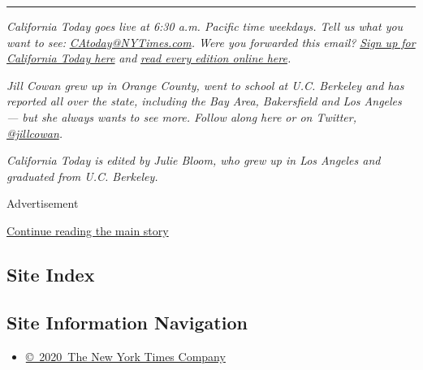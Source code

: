 \begin{center}\rule{0.5\linewidth}{\linethickness}\end{center}

\emph{California Today goes live at 6:30 a.m. Pacific time weekdays.
Tell us what you want to see:}
\href{mailto:CAtoday@NYTimes.com}{\emph{CAtoday@NYTimes.com}}\emph{.
Were you forwarded this email?}
\href{https://www.nytimes3xbfgragh.onion/newsletters/california-today?module=inline}{\emph{Sign
up for California Today here}} \emph{and}
\href{https://www.nytimes3xbfgragh.onion/column/california-today}{\emph{read
every edition online here}}\emph{.}

\emph{Jill Cowan grew up in Orange County, went to school at U.C.
Berkeley and has reported all over the state, including the Bay Area,
Bakersfield and Los Angeles --- but she always wants to see more. Follow
along here or on Twitter,}
\href{https://twitter.com/JillCowan}{\emph{@jillcowan}}\emph{.}

\emph{California Today is edited by Julie Bloom, who grew up in Los
Angeles and graduated from U.C. Berkeley.}

Advertisement

\protect\hyperlink{after-bottom}{Continue reading the main story}

\hypertarget{site-index}{%
\subsection{Site Index}\label{site-index}}

\hypertarget{site-information-navigation}{%
\subsection{Site Information
Navigation}\label{site-information-navigation}}

\begin{itemize}
\tightlist
\item
  \href{https://help.nytimes3xbfgragh.onion/hc/en-us/articles/115014792127-Copyright-notice}{©~2020~The
  New York Times Company}
\end{itemize}

